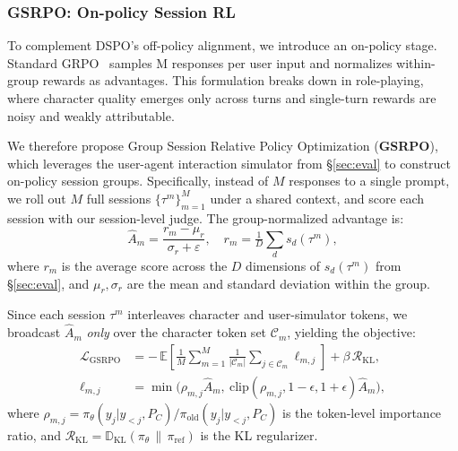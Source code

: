 \subsubsection{GSRPO: On-policy Session RL}
\label{sec:stage3}

To complement DSPO's off-policy alignment, we introduce an on-policy stage. Standard GRPO~\cite{shao2024deepseekmath} samples M responses per user input and normalizes within-group rewards as advantages. This formulation breaks down in role-playing, where character quality emerges only across turns and single-turn rewards are noisy and weakly attributable.



We therefore propose Group Session Relative Policy Optimization (\textbf{GSRPO}), which leverages the user-agent interaction simulator from §\ref{sec:eval} to construct on-policy session groups. Specifically, instead of $M$  responses to a single prompt, we roll out $M$ full sessions $\{\tau^{m}\}_{m=1}^M$ under a shared context, and score each session with our session-level judge. The group-normalized advantage is:
\begin{equation}
\hat{A}_m = \frac{r_m - \mu_r}{\sigma_r + \varepsilon},\quad r_m = \tfrac{1}{D}\sum_{d} s_d(\tau^m),
\label{advantage}
\end{equation}
where $r_m$ is the average score across the $D$  dimensions of $s_d(\tau^m)$ from §\ref{sec:eval}, and $\mu_r, \sigma_r$ are the mean and standard deviation within the group. 


Since each session $\tau^m$ interleaves character and user-simulator tokens, we broadcast $\hat{A}_m$ \emph{only} over the character token set $\mathcal{C}_m$, yielding the objective:
{\small\begin{align}
\mathcal{L}_{\text{GSRPO}} &= -\,\mathbb{E}\!\left[\tfrac{1}{M}\sum_{m=1}^{M}\tfrac{1}{|\mathcal{C}_m|}\sum_{j \in \mathcal{C}_m} \ell_{m,j}\right] + \beta\,\mathcal{R}_{\text{KL}}, \nonumber\\
\ell_{m,j} &= \min\bigl(\rho_{m,j}\hat{A}_m,\ \mathrm{clip}(\rho_{m,j}, 1{-}\epsilon, 1{+}\epsilon)\hat{A}_m\bigr),
\label{grspo}
\end{align}
}
where $\rho_{m,j} = \pi_\theta(y_j|y_{<j},P_C)/\pi_{\text{old}}(y_j|y_{<j},P_C)$ is the token-level importance ratio, and $\mathcal{R}_{\text{KL}} = \mathbb{D}_{\text{KL}}(\pi_\theta\,\|\,\pi_{\text{ref}})$ is the KL regularizer.






